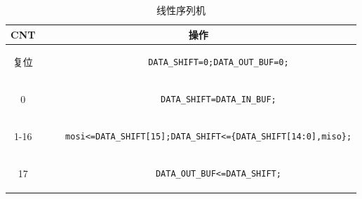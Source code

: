     \begin{table}[H]
        \centering
        \caption{线性序列机}
    \begin{tabular}{c|c}
    \hline
    CNT & 操作  \\ \hline
    复位 & \begin{lstlisting}
        DATA_SHIFT=0;DATA_OUT_BUF=0;
            \end{lstlisting}    \\ \hline
    
    0 & \begin{lstlisting}
        DATA_SHIFT=DATA_IN_BUF;
        \end{lstlisting}   \\ \hline
    
    1-16&  \begin{lstlisting}
    mosi<=DATA_SHIFT[15];DATA_SHIFT<={DATA_SHIFT[14:0],miso};
            \end{lstlisting} \\ \hline
    
    17&     \begin{lstlisting}
        DATA_OUT_BUF<=DATA_SHIFT;
            \end{lstlisting}  \\ \hline
            
        \end{tabular}
                \label{线性序列机}
    \end{table}
    
